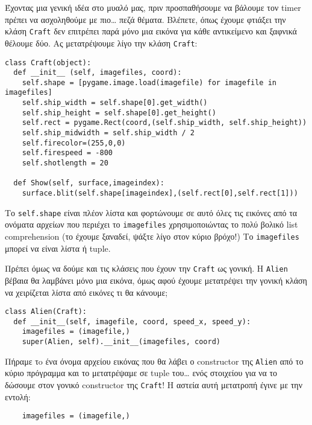 Έχοντας μια γενική ιδέα στο μυαλό μας, πριν προσπαθήσουμε να βάλουμε τον
timer πρέπει να ασχοληθούμε με πιο\ldots{} πεζά θέματα. Βλέπετε, όπως έχουμε
φτιάξει την κλάση {\tt Craft} δεν επιτρέπει παρά μόνο μια εικόνα για κάθε
αντικείμενο και ξαφνικά θέλουμε δύο. Ας μετατρέψουμε λίγο την κλάση {\tt Craft}:

\begin{verbatim}
class Craft(object):
  def __init__ (self, imagefiles, coord):
    self.shape = [pygame.image.load(imagefile) for imagefile in imagefiles]
    self.ship_width = self.shape[0].get_width()
    self.ship_height = self.shape[0].get_height()
    self.rect = pygame.Rect(coord,(self.ship_width, self.ship_height))
    self.ship_midwidth = self.ship_width / 2
    self.firecolor=(255,0,0)
    self.firespeed = -800
    self.shotlength = 20

  def Show(self, surface,imageindex):
    surface.blit(self.shape[imageindex],(self.rect[0],self.rect[1]))
\end{verbatim}

Το {\tt self.shape} είναι πλέον λίστα και φορτώνουμε σε αυτό όλες τις εικόνες
   από τα ονόματα αρχείων που περιέχει το {\tt imagefiles} χρησιμοποιώντας το
   πολύ βολικό list comprehension
   (το έχουμε ξαναδεί, ψάξτε λίγο στον κύριο βρόχο!) Το {\tt imagefiles} μπορεί
   να είναι λίστα ή tuple.

Πρέπει όμως να δούμε και τις κλάσεις
που έχουν την {\tt Craft} ως γονική. Η {\tt Alien} βέβαια θα λαμβάνει μόνο μια εικόνα,
όμως αφού έχουμε μετατρέψει την γονική κλάση να χειρίζεται λίστα από
εικόνες τι θα κάνουμε;

\begin{verbatim}
class Alien(Craft):
  def __init__(self, imagefile, coord, speed_x, speed_y):
    imagefiles = (imagefile,)
    super(Alien, self).__init__(imagefiles, coord)
\end{verbatim}

Πήραμε τo ένα όνομα αρχείου εικόνας που θα λάβει ο constructor της {\tt Alien}
   από το κύριο πρόγραμμα και το μετατρέψαμε σε tuple του\ldots{} ενός
   στοιχείου για να το δώσουμε στον γονικό constructor της {\tt Craft}! Η αστεία
   αυτή μετατροπή έγινε με την εντολή:

\begin{verbatim}
    imagefiles = (imagefile,)
\end{verbatim}

